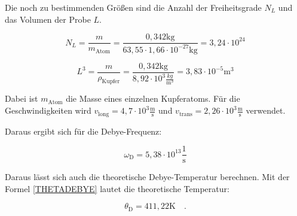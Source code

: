 \noindent Die noch zu bestimmenden Größen sind die Anzahl der Freiheitsgrade \(N_L\) und das Volumen der Probe \(L\).

\begin{equation*}
N_L=\frac{m}{m_\text{Atom}}=\frac{0,342\text{kg}}{63,55\cdot 1,66\cdot10^{-27}\text{kg}}=3,24\cdot10^{24}
\end{equation*}

\begin{equation*}
L^3=\frac{m}{\rho_\text{Kupfer}}=\frac{0,342\text{kg}}{8,92\cdot10^3\frac{kg}{\text{m}^3}}=3,83\cdot10^{-5}\text{m}^3
\end{equation*}

\noindent Dabei ist \(m_\text{Atom}\) die Masse eines einzelnen Kupferatoms. Für die Geschwindigkeiten wird \(v_\text{long}=4,7\cdot10^3\frac{\text{m}}{\text{s}}\) und \(v_\text{trans}=2,26\cdot10^3\frac{\text{m}}{\text{s}}\) verwendet.

\noindent Daraus ergibt sich für die Debye-Frequenz:

\begin{equation*}
\omega_\text{D}=5,38\cdot10^{13}\frac{1}{\text{s}}
\end{equation*}

\noindent Daraus lässt sich auch die theoretische Debye-Temperatur berechnen. Mit der Formel \ref{THETADEBYE} lautet die theoretische Temperatur:

\begin{equation*}
\theta_\text{D}=411,22\text{K}\quad.
\end{equation*}